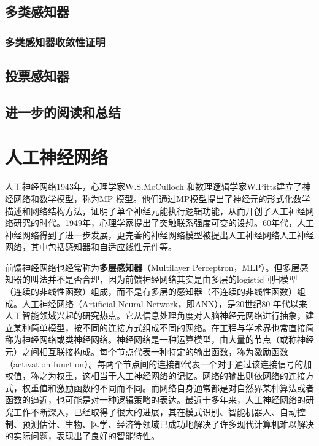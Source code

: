 \documentclass[11pt,fleqn, UTF8]{ctexbook} %
\begin{document}
\section{多类感知器}
\subsection{多类感知器收敛性证明}
\section{投票感知器}
\section{进一步的阅读和总结}

\chapter{人工神经网络}
人工神经网络1943年，心理学家W.S.McCulloch 和数理逻辑学家W.Pitts建立了神经网络和数学模型，称为MP 模型。他们通过MP模型提出了神经元的形式化数学描述和网络结构方法，证明了单个神经元能执行逻辑功能，从而开创了人工神经网络研究的时代。1949年，心理学家提出了突触联系强度可变的设想。60年代，人工神经网络得到了进一步发展，更完善的神经网络模型被提出人工神经网络人工神经网络，其中包括感知器和自适应线性元件等。

前馈神经网络也经常称为\textbf{多层感知器}（Multilayer Perceptron，MLP）。但多层感知器的叫法并不是否合理，因为前馈神经网络其实是由多层的logistic回归模型（连续的非线性函数）组成，而不是有多层的感知器（不连续的非线性函数）组成\cite{bishop2006pattern}。人工神经网络（Artificial Neural Network，即ANN），是20世纪80 年代以来人工智能领域兴起的研究热点。它从信息处理角度对人脑神经元网络进行抽象，建立某种简单模型，按不同的连接方式组成不同的网络。在工程与学术界也常直接简称为神经网络或类神经网络。神经网络是一种运算模型，由大量的节点（或称神经元）之间相互联接构成。每个节点代表一种特定的输出函数，称为激励函数（activation function）。每两个节点间的连接都代表一个对于通过该连接信号的加权值，称之为权重，这相当于人工神经网络的记忆。网络的输出则依网络的连接方式，权重值和激励函数的不同而不同。而网络自身通常都是对自然界某种算法或者函数的逼近，也可能是对一种逻辑策略的表达。最近十多年来，人工神经网络的研究工作不断深入，已经取得了很大的进展，其在模式识别、智能机器人、自动控制、预测估计、生物、医学、经济等领域已成功地解决了许多现代计算机难以解决的实际问题，表现出了良好的智能特性。
\end{document}
